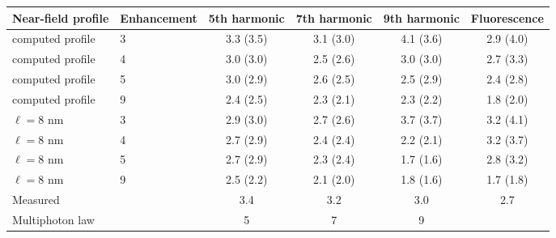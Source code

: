 \begin{tabular}{llcccc}
\hline\hline
Near-field profile & Enhancement & 5th harmonic & 7th harmonic & 9th harmonic & Fluorescence \\
\hline
computed profile & 3 & 3.3 (3.5) & 3.1 (3.0) & 4.1 (3.6) & 2.9 (4.0) \\
computed profile & 4 & 3.0 (3.0) & 2.5 (2.6) & 3.0 (3.0) & 2.7 (3.3) \\
computed profile & 5 & 3.0 (2.9) & 2.6 (2.5) & 2.5 (2.9) & 2.4 (2.8) \\
computed profile & 9 & 2.4 (2.5) & 2.3 (2.1) & 2.3 (2.2) & 1.8 (2.0) \\
\hline
$\ell=8$ nm & 3 & 2.9 (3.0) & 2.7 (2.6) & 3.7 (3.7) & 3.2 (4.1) \\
$\ell=8$ nm & 4 & 2.7 (2.9) & 2.4 (2.4) & 2.2 (2.1) & 3.2 (3.7) \\
$\ell=8$ nm & 5 & 2.7 (2.9) & 2.3 (2.4) & 1.7 (1.6) & 2.8 (3.2) \\
$\ell=8$ nm & 9 & 2.5 (2.2) & 2.1 (2.0) & 1.8 (1.6) & 1.7 (1.8) \\
\hline
Measured & & 3.4 & 3.2 & 3.0 & 2.7 \\
Multiphoton law & & 5 & 7 & 9 & \\
\hline\hline
\end{tabular}
